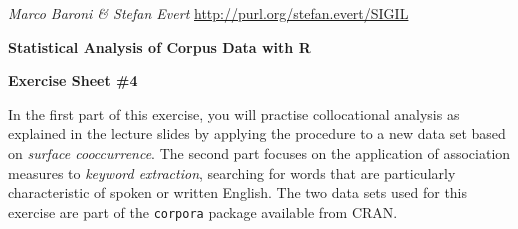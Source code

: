 \documentclass[a4paper,12pt]{article}
\begin{document}
\emph{Marco Baroni \& Stefan Evert} \hfill %
{\small \url{http://purl.org/stefan.evert/SIGIL}}

\begin{center}
  \textbf{\Large Statistical Analysis of Corpus Data with R}

  \textbf{\large Exercise Sheet \#4}
\end{center}

In the first part of this exercise, you will practise collocational analysis
as explained in the lecture slides by applying the procedure to a new data set
based on \emph{surface cooccurrence}.  The second part focuses on the
application of association measures to \emph{keyword extraction}, searching
for words that are particularly characteristic of spoken or written English.
The two data sets used for this exercise are part of the \texttt{corpora}
package available from CRAN.
\end{document}

